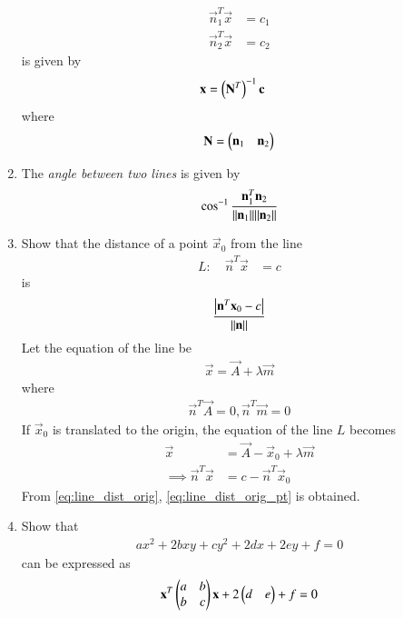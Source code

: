 \begin{enumerate}[label=\arabic*.,ref=\thesubsection.\theenumi]
\begin{align}
\vec{n}_1^T\vec{x} &=c_1
\\
\vec{n}_2^T\vec{x} &=c_2
\end{align}
is given by 
\begin{align}
\mathbf{x} &=\left(\mathbf{N}^T\right)^{-1}\mathbf{c}
\end{align}
where 
\begin{align}
\mathbf{N} = \begin{pmatrix}\mathbf{n}_1 & \mathbf{n}_2\end{pmatrix}
\end{align}
\item The {\em angle between two lines} is given by 
\begin{align}
\cos ^{-1} \frac{\mathbf{n}_1 ^T \mathbf{n}_2}{\lVert\mathbf{n}_1\rVert  \lVert\mathbf{n}_2\rVert}
\end{align}
\item Show that the distance of a point $\vec{x}_0$ from the line 
\begin{align}
L: \quad \vec{n}^T\vec{x} &=c
\end{align}
is 
\begin{align}
\frac{\left\vert\mathbf{n}^T\mathbf{x}_0-c\right\vert}{\lVert\mathbf{n}\rVert} 
\end{align}
\solution Let the equation of the line be 
\begin{align}
\vec{x} = \vec{A} + \lambda \vec{m}
\end{align}
%
where 
\begin{align}
\label{eq:line_dist_orig_pt}
\vec{n}^T\vec{A} = 0, \vec{n}^T\vec{m} = 0
\end{align}
If $\vec{x}_0$ is translated to the origin, the equation of the line $L$ becomes 
\begin{align}
\vec{x} &= \vec{A}- \vec{x}_0+ \lambda \vec{m}
\\
\implies 
\vec{n}^T\vec{x} &=c-\vec{n}^T\vec{x}_0
\end{align}
From \eqref{eq:line_dist_orig}, \eqref{eq:line_dist_orig_pt} is obtained.
\item Show that 
\begin{align}
ax^2+2bxy+cy^2+2dx+2ey+f=0
\end{align}
can be expressed as
\begin{align}
\mathbf{x}^T\begin{pmatrix}a & b\\ b & c\end{pmatrix}\mathbf{x}+2\begin{pmatrix}d & e\end{pmatrix}+f=0
\end{align}


\end{enumerate}
